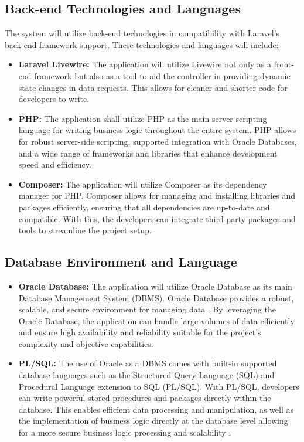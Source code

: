 \subsection{Back-end Technologies and Languages}
    The system will utilize back-end technologies in compatibility with Laravel's back-end framework support. These technologies and languages will include:
    
    \begin{itemize}
        \item[] \textbf{Laravel Livewire:} The application will utilize Livewire not only as a front-end framework but also as a tool to aid the controller in providing dynamic state changes in data requests. This allows for cleaner and shorter code for developers to write.
        \item[] \textbf{PHP:} The application shall utilize PHP as the main server scripting language for writing business logic throughout the entire system. PHP allows for robust server-side scripting, supported integration with Oracle Databases, and a wide range of frameworks and libraries that enhance development speed and efficiency. 
        \item[] \textbf{Composer:} The application will utilize Composer as its dependency manager for PHP. Composer allows for managing and installing libraries and packages efficiently, ensuring that all dependencies are up-to-date and compatible. With this, the developers can integrate third-party packages and tools to streamline the project setup.
      
    \end{itemize}

\subsection{Database Environment and Language}
    \begin{itemize}    
        \item[] \textbf{Oracle Database:} The application will utilize Oracle Database as its main Database Management System (DBMS). Oracle Database provides a robust, scalable, and secure environment for managing data \cite{oracle2nd}. By leveraging the Oracle Database, the application can handle large volumes of data efficiently and ensure high availability and reliability suitable for the project's complexity and objective capabilities.
        \item[] \textbf{PL/SQL:} The use of Oracle as a DBMS comes with built-in supported database languages such as the Structured Query Language (SQL) and Procedural Language extension to SQL (PL/SQL). With PL/SQL, developers can write powerful stored procedures and packages directly within the database. This enables efficient data processing and manipulation, as well as the implementation of business logic directly at the database level allowing for a more secure business logic processing and scalability \cite{oracle1nd}. 
    \end{itemize}